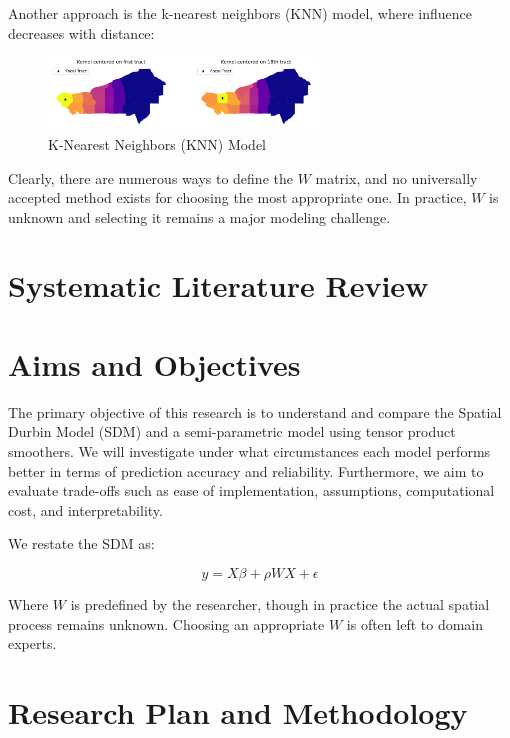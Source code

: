 \documentclass{article}
\begin{document}
Another approach is the k-nearest neighbors (KNN) model, where influence decreases with distance:

\begin{figure}[H]
	\centering
	\includegraphics[width=0.64\textwidth]{assets/kmodel.png}
	\caption{K-Nearest Neighbors (KNN) Model}
\end{figure}

Clearly, there are numerous ways to define the $W$ matrix, and no universally accepted method exists for choosing the most appropriate one. In practice, $W$ is unknown and selecting it remains a major modeling challenge.

\section{Systematic Literature Review}


\section{Aims and Objectives}

The primary objective of this research is to understand and compare the Spatial Durbin Model (SDM) and a semi-parametric model using tensor product smoothers. We will investigate under what circumstances each model performs better in terms of prediction accuracy and reliability. Furthermore, we aim to evaluate trade-offs such as ease of implementation, assumptions, computational cost, and interpretability.

We restate the SDM as:

\begin{equation}
	y = X \beta + \rho W X + \epsilon
\end{equation}

Where $W$ is predefined by the researcher, though in practice the actual spatial process remains unknown. Choosing an appropriate $W$ is often left to domain experts.

\section{Research Plan and Methodology}
\end{document}

